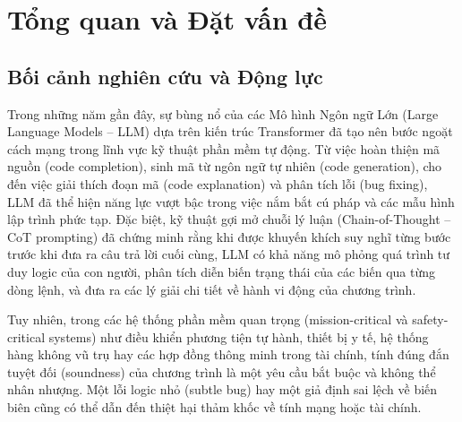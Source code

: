 \chapter{Tổng quan và Đặt vấn đề}
\label{ch:introduction}

\section{Bối cảnh nghiên cứu và Động lực}
\label{sec:context_and_motivation}
Trong những năm gần đây, sự bùng nổ của các Mô hình Ngôn ngữ Lớn (Large Language Models -- LLM) dựa trên kiến trúc Transformer \cite{chen2021evaluating} đã tạo nên bước ngoặt cách mạng trong lĩnh vực kỹ thuật phần mềm tự động. Từ việc hoàn thiện mã nguồn (code completion), sinh mã từ ngôn ngữ tự nhiên (code generation), cho đến việc giải thích đoạn mã (code explanation) và phân tích lỗi (bug fixing), LLM đã thể hiện năng lực vượt bậc trong việc nắm bắt cú pháp và các mẫu hình lập trình phức tạp. Đặc biệt, kỹ thuật gợi mở chuỗi lý luận (Chain-of-Thought -- CoT prompting) \cite{wei2022chain,nye2021show,gao2023pal} đã chứng minh rằng khi được khuyến khích suy nghĩ từng bước trước khi đưa ra câu trả lời cuối cùng, LLM có khả năng mô phỏng quá trình tư duy logic của con người, phân tích diễn biến trạng thái của các biến qua từng dòng lệnh, và đưa ra các lý giải chi tiết về hành vi động của chương trình.

Tuy nhiên, trong các hệ thống phần mềm quan trọng (mission-critical và safety-critical systems) như điều khiển phương tiện tự hành, thiết bị y tế, hệ thống hàng không vũ trụ hay các hợp đồng thông minh trong tài chính, tính đúng đắn tuyệt đối (soundness) của chương trình là một yêu cầu bắt buộc và không thể nhân nhượng. Một lỗi logic nhỏ (subtle bug) hay một giả định sai lệch về biến biên cũng có thể dẫn đến thiệt hại thảm khốc về tính mạng hoặc tài chính. 

